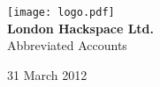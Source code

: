 


\begin{titlepage}
\begin{center}
\texttt{[image: logo.pdf]}\\[48pt]
{\bf \LARGE London Hackspace Ltd.}\\[14pt]
{\Large Abbreviated Accounts}

\vfill
31 March 2012

\end{center}
\end{titlepage}





